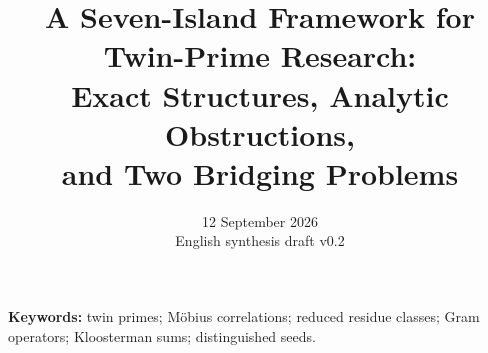 \documentclass[11pt,a4paper]{article}
\title{A Seven-Island Framework for Twin-Prime Research:\\
Exact Structures, Analytic Obstructions,\\and Two Bridging Problems}
\author{}
\date{12 September 2026\\English synthesis draft v0.2}
\theoremstyle{definition}
\theoremstyle{remark}
\begin{document}
\pagestyle{plain}
\maketitle
\begin{abstract}

\end{abstract}
\noindent\textbf{Keywords:} twin primes; M\"obius correlations; reduced residue classes; Gram operators; Kloosterman sums; distinguished seeds.
\clearpage
\setcounter{tocdepth}{1}
\tableofcontents
\medskip

\clearpage









\clearpage
\appendix


\clearpage
{}
{}
\begingroup\raggedright


\endgroup
\end{document}
